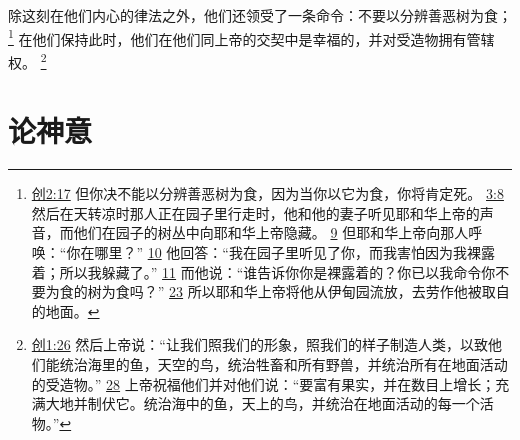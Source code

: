\documentclass[12pt, a4paper, oneside]{ctexart}
\begin{document}
	除这刻在他们内心的律法之外，他们还领受了一条命令：不要以分辨善恶树为食；
	\footnote {
		\href{https://biblehub.com/genesis/2-17.htm}{创2:17} 但你决不能以分辨善恶树为食，因为当你以它为食，你将肯定死。
		\href{https://biblehub.com/genesis/3-8.htm}{3:8} 然后在天转凉时那人正在园子里行走时，他和他的妻子听见耶和华上帝的声音，而他们在园子的树丛中向耶和华上帝隐藏。
		\href{https://biblehub.com/genesis/3-9.htm}{9} 但耶和华上帝向那人呼唤：“你在哪里？”
		\href{https://biblehub.com/genesis/3-10.htm}{10} 他回答：“我在园子里听见了你，而我害怕因为我裸露着；所以我躲藏了。”
		\href{https://biblehub.com/genesis/3-11.htm}{11} 而他说：“谁告诉你你是裸露着的？你已以我命令你不要为食的树为食吗？”
		\href{https://biblehub.com/genesis/3-23.htm}{23} 所以耶和华上帝将他从伊甸园流放，去劳作他被取自的地面。
	}
	在他们保持此时，他们在他们同上帝的交契中是幸福的，并对受造物拥有管辖权。
	\footnote {
		\href{https://biblehub.com/genesis/1-26.htm}{创1:26} 然后上帝说：“让我们照我们的形象，照我们的样子制造人类，以致他们能统治海里的鱼，天空的鸟，统治牲畜和所有野兽，并统治所有在地面活动的受造物。”
		\href{https://biblehub.com/genesis/1-28.htm}{28} 上帝祝福他们并对他们说：“要富有果实，并在数目上增长；充满大地并制伏它。统治海中的鱼，天上的鸟，并统治在地面活动的每一个活物。”
	}

\section{论神意}
\end{document}
